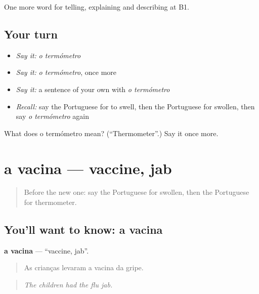 \begin{grammarlens}[title={What you've built}]
One more word for telling, explaining and describing at B1.
\end{grammarlens}

\subsection*{Your turn}
\begin{itemize}
\raggedright
  \item \emph{Say it:} \emph{o termómetro}
  \item \emph{Say it:} \emph{o termómetro}, once more
  \item \emph{Say it:} a sentence of your own with \emph{o termómetro}
  \item \emph{Recall:} say the Portuguese for to swell, then the Portuguese for swollen, then say \emph{o termómetro} again
\end{itemize}

\begin{tcolorbox}[breakable,colback=teal!4,colframe=teal!35!black,title={Before you move on}]
What does o termómetro mean? (\textquotedblleft{}Thermometer\textquotedblright{}.) Say it once more.
\end{tcolorbox}
\section[a vacina]{a vacina — vaccine, jab}

\label{lesson:PT-C486-vacina}



\begin{quote}
Before the new one: say the Portuguese for swollen, then the Portuguese for thermometer.
\end{quote}

\subsection*{You'll want to know: a vacina}
\textbf{a vacina} — \textquotedblleft{}vaccine, jab\textquotedblright{}.

\begin{quote}
As crianças levaram a vacina da gripe.
\end{quote}

\begin{quote}
\emph{The children had the flu jab.}
\end{quote}

